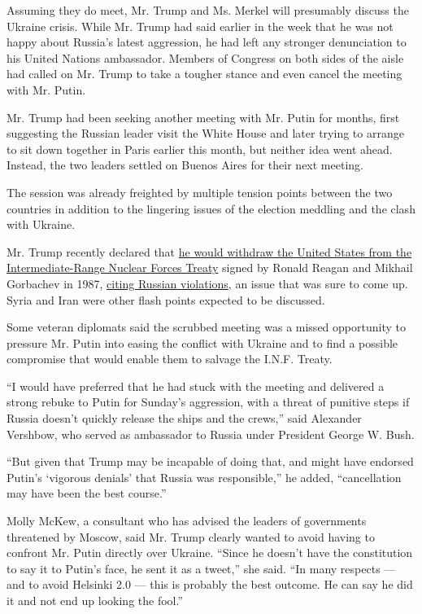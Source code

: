 Assuming they do meet, Mr. Trump and Ms. Merkel will presumably discuss
the Ukraine crisis. While Mr. Trump had said earlier in the week that he
was not happy about Russia's latest aggression, he had left any stronger
denunciation to his United Nations ambassador. Members of Congress on
both sides of the aisle had called on Mr. Trump to take a tougher stance
and even cancel the meeting with Mr. Putin.

Mr. Trump had been seeking another meeting with Mr. Putin for months,
first suggesting the Russian leader visit the White House and later
trying to arrange to sit down together in Paris earlier this month, but
neither idea went ahead. Instead, the two leaders settled on Buenos
Aires for their next meeting.

The session was already freighted by multiple tension points between the
two countries in addition to the lingering issues of the election
meddling and the clash with Ukraine.

Mr. Trump recently declared that
\href{https://www.nytimes.com/2018/10/19/us/politics/russia-nuclear-arms-treaty-trump-administration.html}{he
would withdraw the United States from the Intermediate-Range Nuclear
Forces Treaty} signed by Ronald Reagan and Mikhail Gorbachev in 1987,
\href{https://www.nytimes.com/2018/10/23/world/europe/inf-treaty-russia-united-states-trump-nuclear.html}{citing
Russian violations}, an issue that was sure to come up. Syria and Iran
were other flash points expected to be discussed.

Some veteran diplomats said the scrubbed meeting was a missed
opportunity to pressure Mr. Putin into easing the conflict with Ukraine
and to find a possible compromise that would enable them to salvage the
I.N.F. Treaty.

``I would have preferred that he had stuck with the meeting and
delivered a strong rebuke to Putin for Sunday's aggression, with a
threat of punitive steps if Russia doesn't quickly release the ships and
the crews,'' said Alexander Vershbow, who served as ambassador to Russia
under President George W. Bush.

``But given that Trump may be incapable of doing that, and might have
endorsed Putin's `vigorous denials' that Russia was responsible,'' he
added, ``cancellation may have been the best course.''

Molly McKew, a consultant who has advised the leaders of governments
threatened by Moscow, said Mr. Trump clearly wanted to avoid having to
confront Mr. Putin directly over Ukraine. ``Since he doesn't have the
constitution to say it to Putin's face, he sent it as a tweet,'' she
said. ``In many respects --- and to avoid Helsinki 2.0 --- this is
probably the best outcome. He can say he did it and not end up looking
the fool.''


